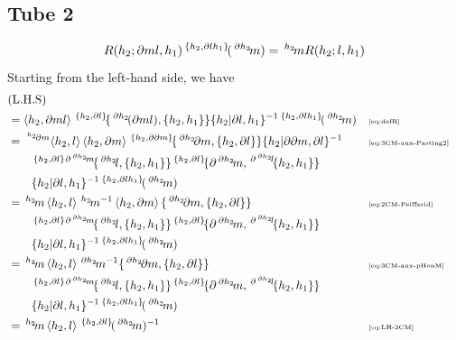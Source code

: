 \documentclass[11pt, reqno]{amsart} %
\newcommand{\act}[1]{\,\sp{#1}\!}
\theoremstyle{definition}
\theoremstyle{remark}
\numberwithin{equation}{section}
\begin{document}
\subsection{Tube 2}
\[
  R(h_2;\partial ml,h_1)\act{\{h_2,\partial lh_1\}}(\act{\partial h_2}m) = \act{h_2}mR(h_2;l,h_1)
\]
Starting from the left-hand side, we have
\begin{align*}
  &(\text{L.H.S}) \\
  &= 
  \left<h_2,\partial ml\right>\act{\{h_2,\partial l\}}\{\act{\partial h_2}(\partial ml),\{h_2,h_1\}\}\{h_2|\partial l,h_1\}^{-1}
  \act{\{h_2,\partial lh_1\}}(\act{\partial h_2}m) & &\text{\tiny \eqref{eq:defR}} \\
  &= 
  \act{\act{h_2}\partial m}\left<h_2,l\right>\left<h_2,\partial m\right>\act{\{h_2,\partial \partial m\}}\{\act{\partial h_2}\partial m,\{h_2,\partial l\}\}\{h_2|\partial \partial m,\partial l\}^{-1} & &\text{\tiny \eqref{eq:3CM-aux-Pasting2}} \\
  &\qquad 
  \act{\{h_2,\partial l\}}\act{\partial \act{\partial h_2}m}\{\act{\partial h_2}l,\{h_2,h_1\}\}\act{\{h_2,\partial l\}}\{\partial \act{\partial h_2}m,\act{\partial \act{\partial h_2}l}\{h_2,h_1\}\} \\
  &\qquad 
  \{h_2|\partial l,h_1\}^{-1}
  \act{\{h_2,\partial lh_1\}}(\act{\partial h_2}m) \\
  &= 
  \act{h_2}m\left<h_2,l\right>\act{h_2}m^{-1}\left<h_2,\partial m\right>\{\act{\partial h_2}\partial m,\{h_2,\partial l\}\} & &\text{\tiny \eqref{eq:2CM-Peifferid}} \\
  &\qquad 
  \act{\{h_2,\partial l\}}\act{\partial \act{\partial h_2}m}\{\act{\partial h_2}l,\{h_2,h_1\}\}\act{\{h_2,\partial l\}}\{\partial \act{\partial h_2}m,\act{\partial \act{\partial h_2}l}\{h_2,h_1\}\} \\
  &\qquad 
  \{h_2|\partial l,h_1\}^{-1}
  \act{\{h_2,\partial lh_1\}}(\act{\partial h_2}m) \\
  &= 
  \act{h_2}m\left<h_2,l\right>\act{\partial h_2}m^{-1}\{\act{\partial h_2}\partial m,\{h_2,\partial l\}\} & &\text{\tiny \eqref{eq:3CM-aux-pHonM}} \\
  &\qquad 
  \act{\{h_2,\partial l\}}\act{\partial \act{\partial h_2}m}\{\act{\partial h_2}l,\{h_2,h_1\}\}\act{\{h_2,\partial l\}}\{\partial \act{\partial h_2}m,\act{\partial \act{\partial h_2}l}\{h_2,h_1\}\} \\
  &\qquad 
  \{h_2|\partial l,h_1\}^{-1}
  \act{\{h_2,\partial lh_1\}}(\act{\partial h_2}m) \\
  &= 
  \act{h_2}m\left<h_2,l\right>\act{\{h_2,\partial l\}}(\act{\partial h_2}m)^{-1} & &\text{\tiny \eqref{eq:LH-2CM}} \\

\end{align*}
\end{document}
